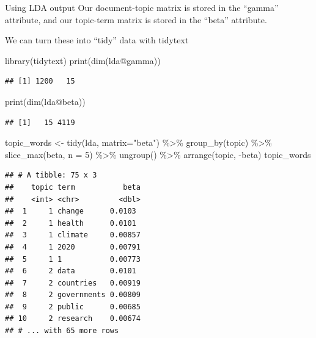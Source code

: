 \documentclass[
  10pt,
  ignorenonframetext,
  aspectratio=169]{beamer}
\newenvironment{Shaded}{\begin{snugshade}}{\end{snugshade}}
\newcommand{\AttributeTok}[1]{\textcolor[rgb]{0.80,0.80,0.80}{#1}}
\newcommand{\DecValTok}[1]{\textcolor[rgb]{0.86,0.86,0.80}{#1}}
\newcommand{\FunctionTok}[1]{\textcolor[rgb]{0.94,0.94,0.56}{#1}}
\newcommand{\NormalTok}[1]{\textcolor[rgb]{0.80,0.80,0.80}{#1}}
\newcommand{\OtherTok}[1]{\textcolor[rgb]{0.94,0.94,0.56}{#1}}
\newcommand{\SpecialCharTok}[1]{\textcolor[rgb]{0.86,0.64,0.64}{#1}}
\newcommand{\StringTok}[1]{\textcolor[rgb]{0.80,0.58,0.58}{#1}}
\begin{document}
\begin{frame}[fragile]{Using LDA output}
\protect\hypertarget{using-lda-output}{}
Our document-topic matrix is stored in the ``gamma'' attribute, and our
topic-term matrix is stored in the ``beta'' attribute.

We can turn these into ``tidy'' data with tidytext

\medskip
\scriptsize

\begin{Shaded}
\begin{Highlighting}[]
\FunctionTok{library}\NormalTok{(tidytext)}
\FunctionTok{print}\NormalTok{(}\FunctionTok{dim}\NormalTok{(lda}\SpecialCharTok{@}\NormalTok{gamma))}
\end{Highlighting}
\end{Shaded}

\begin{verbatim}
## [1] 1200   15
\end{verbatim}

\begin{Shaded}
\begin{Highlighting}[]
\FunctionTok{print}\NormalTok{(}\FunctionTok{dim}\NormalTok{(lda}\SpecialCharTok{@}\NormalTok{beta))}
\end{Highlighting}
\end{Shaded}

\begin{verbatim}
## [1]   15 4119
\end{verbatim}

\begin{Shaded}
\begin{Highlighting}[]
\NormalTok{topic\_words }\OtherTok{\textless{}{-}} \FunctionTok{tidy}\NormalTok{(lda, }\AttributeTok{matrix=}\StringTok{"beta"}\NormalTok{) }\SpecialCharTok{\%\textgreater{}\%}
  \FunctionTok{group\_by}\NormalTok{(topic) }\SpecialCharTok{\%\textgreater{}\%}
  \FunctionTok{slice\_max}\NormalTok{(beta, }\AttributeTok{n =} \DecValTok{5}\NormalTok{) }\SpecialCharTok{\%\textgreater{}\%} 
  \FunctionTok{ungroup}\NormalTok{() }\SpecialCharTok{\%\textgreater{}\%}
  \FunctionTok{arrange}\NormalTok{(topic, }\SpecialCharTok{{-}}\NormalTok{beta)}
\NormalTok{topic\_words}
\end{Highlighting}
\end{Shaded}

\begin{verbatim}
## # A tibble: 75 x 3
##    topic term           beta
##    <int> <chr>         <dbl>
##  1     1 change      0.0103 
##  2     1 health      0.0101 
##  3     1 climate     0.00857
##  4     1 2020        0.00791
##  5     1 1           0.00773
##  6     2 data        0.0101 
##  7     2 countries   0.00919
##  8     2 governments 0.00809
##  9     2 public      0.00685
## 10     2 research    0.00674
## # ... with 65 more rows
\end{verbatim}
\end{frame}
\end{document}
